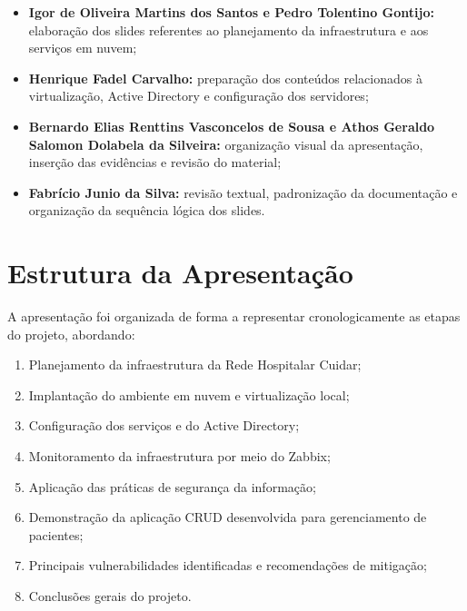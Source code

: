 \documentclass[12pt,a4paper,oneside]{report}
\begin{document}
\begin{itemize}[label=\color{pucblue}$\bullet$]

\item \textbf{Igor de Oliveira Martins dos Santos e Pedro Tolentino Gontijo:} elaboração dos slides referentes ao planejamento da infraestrutura e aos serviços em nuvem;

\item \textbf{Henrique Fadel Carvalho:} preparação dos conteúdos relacionados à virtualização, Active Directory e configuração dos servidores;

\item \textbf{Bernardo Elias Renttins Vasconcelos de Sousa e Athos Geraldo Salomon Dolabela da Silveira:} organização visual da apresentação, inserção das evidências e revisão do material;

\item \textbf{Fabrício Junio da Silva:} revisão textual, padronização da documentação e organização da sequência lógica dos slides.

\end{itemize}

\section{Estrutura da Apresentação}

A apresentação foi organizada de forma a representar cronologicamente as etapas do projeto, abordando:

\begin{enumerate}

\item Planejamento da infraestrutura da Rede Hospitalar Cuidar;

\item Implantação do ambiente em nuvem e virtualização local;

\item Configuração dos serviços e do Active Directory;

\item Monitoramento da infraestrutura por meio do Zabbix;

\item Aplicação das práticas de segurança da informação;

\item Demonstração da aplicação CRUD desenvolvida para gerenciamento de pacientes;

\item Principais vulnerabilidades identificadas e recomendações de mitigação;

\item Conclusões gerais do projeto.

\end{enumerate}
\end{document}
